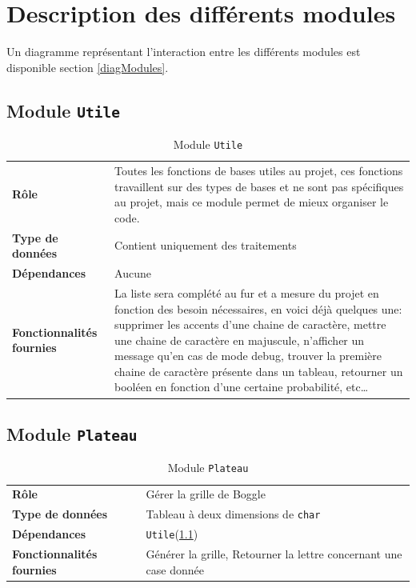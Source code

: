 \documentclass[12pt,a4paper,openany]{article}
\begin{document}
	\section{Description des différents modules}\label{listeModules}
	Un diagramme représentant l'interaction entre les différents modules est disponible section \ref{diagModules}.
	\subsection{Module \texttt{Utile}}\label{utile}
		\begin{table}[H]
			\centering
		\begin{tabular}{p{5cm} p{12cm}}
			\textbf{Rôle} & Toutes les fonctions de bases utiles au projet, ces fonctions tra\-vaillent sur des types de bases et ne sont pas spécifiques au
			projet, mais ce module permet de mieux organiser le code. \\
			\textbf{Type de données} & Contient uniquement des traitements\\ 
			\textbf{Dépendances} & Aucune\\ 
			\textbf{Fonctionnalités fournies} & La liste sera complété au fur et a mesure du projet en
			fonction des besoin nécessaires, en voici déjà quelques une: supprimer les accents d'une chaine de caractère, mettre une chaine de caractère en
			majuscule, n'afficher un message qu'en cas de mode debug, trouver la première chaine de caractère présente dans un tableau, retourner un booléen en
			fonction d'une certaine probabilité, etc\ldots 
		\end{tabular}
		\caption{Module \texttt{Utile}}
	\end{table}
	\subsection{Module \texttt{Plateau}}\label{plateau}
		\begin{table}[H]
			\centering
		\begin{tabular}{p{5cm} p{12cm}}
			\textbf{Rôle} & Gérer la grille de Boggle\\
			\textbf{Type de données} & Tableau à deux dimensions de \texttt{char} \\
			\textbf{Dépendances} & \texttt{Utile}(\ref{utile})\\
			\textbf{Fonctionnalités fournies} & Générer la grille, Retourner la lettre concernant une case donnée\\
		\end{tabular}
		\caption{Module \texttt{Plateau}}
	\end{table}
\end{document}
